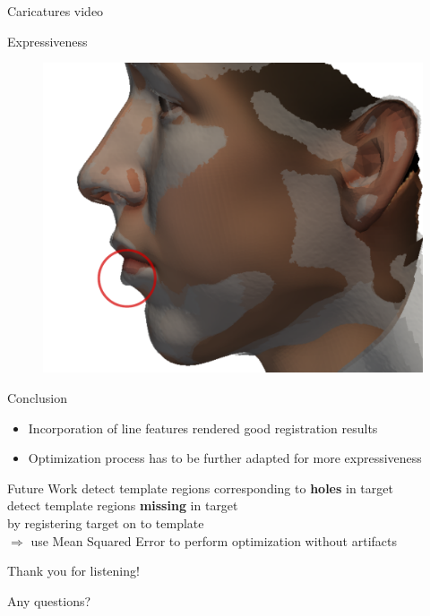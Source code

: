 \documentclass[xcolor=x11names,compress]{beamer}
\begin{document}
\begin{frame}{Caricatures}
    video
\end{frame}

\begin{frame}{Expressiveness}
    \begin{figure}
        \centering
        \includegraphics[width=.8\textwidth]{../resources/img/00041_expressiveness.pdf}
    \end{figure}
\end{frame}
\begin{frame}{Conclusion}
\begin{itemize}
\item Incorporation of line features rendered good registration results\\
\vfill  
\item Optimization process has to be further adapted for more expressiveness\\
\end{itemize}
\end{frame}

\begin{frame}{Future Work}
    detect template regions corresponding to \textbf{holes} in target\\
    detect template regions \textbf{missing} in target\\
    \bigskip
    by registering target on to template\\
    \vfill
    $\Rightarrow$ use Mean Squared Error to perform optimization without artifacts
\end{frame}
\begin{frame}{Thank you for listening!}
    \begin{center}
    \Large Any questions? 
    \end{center}
\end{frame}
\end{document}
